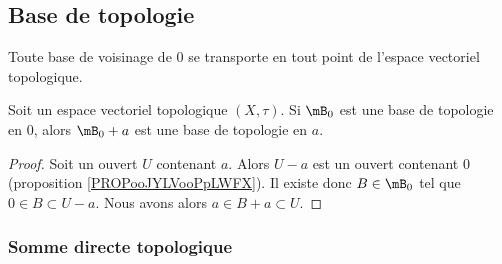 \subsection{Base de topologie}

Toute base de voisinage de \( 0 \) se transporte en tout point de l'espace vectoriel topologique.
\begin{corollary}\label{PropInvarianceTopologie}
	Soit un espace vectoriel topologique \( (X,\tau)\). Si \( \mB_0\) est une base de topologie en \( 0\), alors \( \mB_0+a\) est une base de topologie en \( a\).
\end{corollary}

\begin{proof}
	Soit un ouvert \( U\) contenant \( a\). Alors \( U-a\) est un ouvert contenant \( 0\) (proposition \ref{PROPooJYLVooPpLWFX}). Il existe donc \( B\in\mB_0\) tel que \( 0\in B\subset U-a\). Nous avons alors \( a\in B+a\subset U\).
\end{proof}

\subsubsection{Somme directe topologique}

